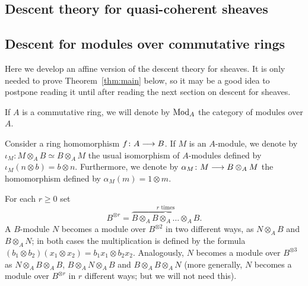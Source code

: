 \begin{4   STACKS}
\begin{4.1 Descent of objects of fibcats}





\end{4.1 Descent of objects of fibcats}
\begin{4.2 Descent for quasi-coherent sheaves}
\setcounter{section}{1}
\section{Descent theory for quasi-coherent sheaves}
\setcounter{theorem}{20}


\subsection{Descent for modules over commutative rings}
\label{subsec:descent-rings}

Here we develop an affine version of the descent theory for \qc sheaves.  It is only needed to prove Theorem~\ref{thm:main} below, so it may be a good idea to postpone reading it until after reading the next section on descent for \qc sheaves.

If $A$ is a commutative ring, we will denote by $\mathrm{Mod}_{A}$ the category of modules over $A$. 

Consider a ring homomorphism $f \colon A \arr B$. If $M$ is an $A$-module, we denote by $\iota_M \colon M \otimes_A B \simeq B \otimes_A M$ the usual isomorphism of $A$-modules defined by $\iota_M(n \otimes b) = b \otimes n$. Furthermore, we denote by $\alpha_M \colon M \arr B \otimes_{A} M$ the homomorphism defined by $\alpha_M(m) = 1 \otimes m$.

For each $r \ge 0$ set
   \[
   B^{\otimes r} = \overbrace{B \otimes_A B
   \otimes_A \dots \otimes _A B}^{\text{$r$ times}}.
   \]
A $B$-module $N$ becomes a module over $B^{\otimes 2}$ in two different ways, as $N \otimes_A B$ and $B \otimes_A N$; in both cases the multiplication is defined by the formula $(b_1 \otimes b_2)(x_1 \otimes x_2) = b_1x_1 \otimes b_2x_2$. Analogously, $N$ becomes a module over $B^{ \otimes 3}$ as $N \otimes_A B \otimes_A B$, $B \otimes_A N \otimes_A B$ and $B \otimes_A B \otimes_A N$ (more generally, $N$ becomes a module over $B^{\otimes r}$ in $r$ different ways; but we will not need this).


\end{4.2 Descent for quasi-coherent sheaves}
\end{4   STACKS}
